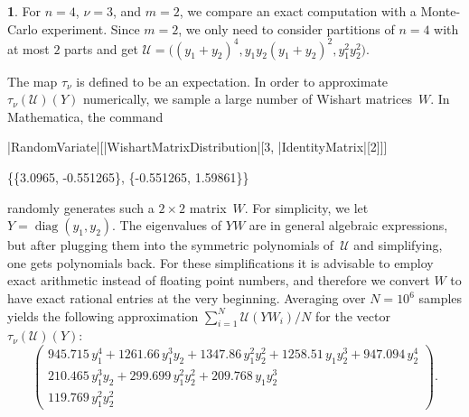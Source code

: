 \documentclass{mathincs}
\numberwithin{equation}{section}
\numberwithin{figure}{section}
\theoremstyle{plain}
\theoremstyle{definition}
\theoremstyle{remark}
\theoremstyle{plain}
\theoremstyle{definition}
\newtheorem{example}[thm]{\protect\examplename}
\theoremstyle{plain}
\theoremstyle{plain}
\DeclareMathOperator{\diag}{diag}
\providecommand{\examplename}{Example}
\begin{document}
\begin{example}
  For $n=4$, $\nu=3$, and $m=2$, we compare an exact computation with a
  Monte-Carlo experiment.  Since $m=2$, we only need to consider partitions
  of $n=4$ with at most $2$ parts and get $\mathcal{U}=\bigl((y_1+y_2)^4,
  y_1y_2(y_1+y_2)^2, y_1^2y_2^2\bigr)$. 

  The map $\tau_\nu$ is defined to be an expectation. In order to approximate
  $\tau_\nu(\mathcal{U})(Y)$ numerically, we sample a large number of Wishart
  matrices~$W$. In Mathematica, the command
  \begin{mma}
    \In |RandomVariate|[|WishartMatrixDistribution|[3, |IdentityMatrix|[2]]] \\
    \Out \rule{0pt}{8pt}\{\{3.0965, -0.551265\}, \{-0.551265, 1.59861\}\} \\
  \end{mma}
  \noindent
  randomly generates such a $2\times2$ matrix~$W$. For simplicity, we let
  $Y=\diag(y_1,y_2)$. The eigenvalues of $YW$ are in general algebraic
  expressions, but after plugging them into the symmetric polynomials
  of~$\mathcal{U}$ and simplifying, one gets polynomials back. For these
  simplifications it is advisable to employ exact arithmetic instead of
  floating point numbers, and therefore we convert $W$ to have exact rational
  entries at the very beginning. Averaging over $N=10^6$ samples yields the
  following approximation $\sum_{i=1}^N \mathcal{U}(YW_i)/N$ for the vector
  $\tau_\nu(\mathcal{U})(Y)$:
  \[
    \begin{pmatrix}
      945.715\,y_1^4 + 1261.66\,y_1^3y_2 + 1347.86\,y_1^2y_2^2 + 1258.51\,y_1y_2^3 + 947.094\,y_2^4 \\
      210.465\,y_1^3y_2 + 299.699\,y_1^2y_2^2 + 209.768\,y_1y_2^3 \\
      119.769\,y_1^2 y_2^2
    \end{pmatrix}.
  \]


\end{example}
\end{document}
